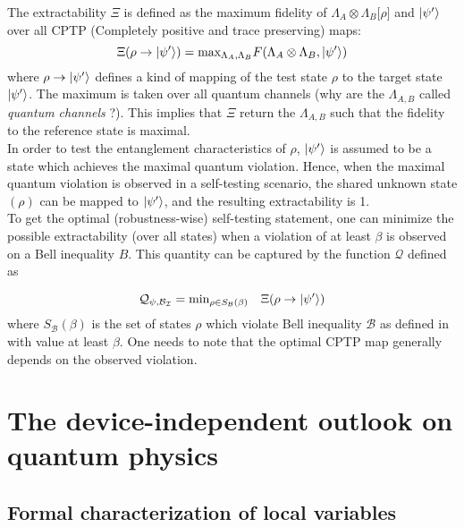 \documentclass[12pt]{article}
\newcommand{\Q}{\mathcal{Q}}
\begin{document}
\begin{multicols}{2}
The extractability $\Xi$ is defined as the maximum fidelity of $\Lambda_A
\otimes \Lambda_B \big[\rho\big]$ and $\ket{\psi'}$ over all CPTP (Completely
positive and trace preserving) maps:
\begin{equation}
	\Xi (\rho \rightarrow \ket{\psi'}) =
	\text{max}_{\Lambda_A ,\Lambda_B} F(\Lambda_A \otimes \Lambda_B, \ket{\psi'})
\end{equation}
where $\rho \rightarrow \ket{\psi'}$ defines a kind of mapping of the test state
$\rho$ to the target state $\ket{\psi'}$. The maximum is taken over all quantum
channels (why are the $\Lambda_{A,B}$ called \textit{quantum channels} ?). This
implies that $\Xi$ return the $\Lambda_{A,B}$ such that the fidelity to the
reference state is maximal.
\\\noindent
In order to test the entanglement characteristics of $\rho$, $\ket{\psi'}$ is
assumed to be a state which achieves the maximal quantum violation. Hence, when
the maximal quantum violation is observed in a self-testing scenario, the shared
unknown state $(\rho)$ can be mapped to $\ket{\psi'}$, and the resulting
extractability is 1.
\\\noindent
To get the optimal (robustness-wise) self-testing statement, one can minimize
the possible extractability (over all states) when a violation of at least
$\beta$ is observed on a Bell inequality $B$. This quantity can be captured by
the function $\Q$ defined as

\begin{equation}
	\Q_{\psi,\mathcal{B}_\mathcal{I}} = \text{min}_{\rho \in
	S_\mathcal{B}(\beta)} \quad \Xi (\rho \rightarrow \ket{\psi'})
\end{equation}
where $S_\mathcal{B}(\beta)$ is the set of states $\rho$ which violate Bell
inequality $\mathcal B$ as defined in
\cite{2018-experimentally-robust-self-testing} with value at least $\beta$.  One
needs to note that the optimal CPTP map generally depends on the observed
violation.

\section*{The device-independent outlook on quantum physics
\cite{scarani2015deviceindependent}}

\subsection*{Formal characterization of local variables}


\end{multicols}
\end{document}
